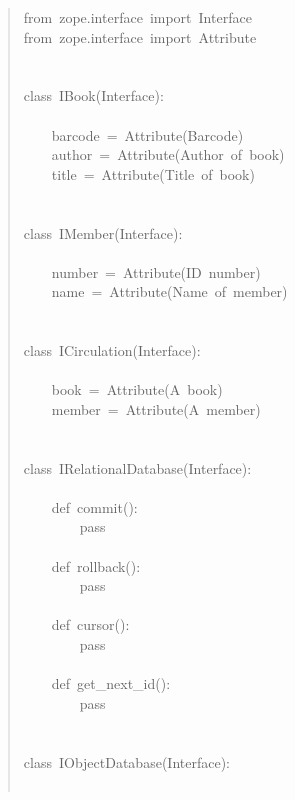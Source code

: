 \documentclass[a4paper,openany,twoside,final]{book}
\begin{document}
\begin{quote}{\ttfamily \raggedright \noindent
from~zope.interface~import~Interface\\
from~zope.interface~import~Attribute\\
~\\
~\\
class~IBook(Interface):\\
~\\
~~~~barcode~=~Attribute(\textquotedbl{}Barcode\textquotedbl{})\\
~~~~author~=~Attribute(\textquotedbl{}Author~of~book\textquotedbl{})\\
~~~~title~=~Attribute(\textquotedbl{}Title~of~book\textquotedbl{})\\
~\\
~\\
class~IMember(Interface):\\
~\\
~~~~number~=~Attribute(\textquotedbl{}ID~number\textquotedbl{})\\
~~~~name~=~Attribute(\textquotedbl{}Name~of~member\textquotedbl{})\\
~\\
~\\
class~ICirculation(Interface):\\
~\\
~~~~book~=~Attribute(\textquotedbl{}A~book\textquotedbl{})\\
~~~~member~=~Attribute(\textquotedbl{}A~member\textquotedbl{})\\
~\\
~\\
class~IRelationalDatabase(Interface):\\
~\\
~~~~def~commit():\\
~~~~~~~~pass\\
~\\
~~~~def~rollback():\\
~~~~~~~~pass\\
~\\
~~~~def~cursor():\\
~~~~~~~~pass\\
~\\
~~~~def~get\_next\_id():\\
~~~~~~~~pass\\
~\\
~\\
class~IObjectDatabase(Interface):\\
~\\
}
\end{quote}
\end{document}

